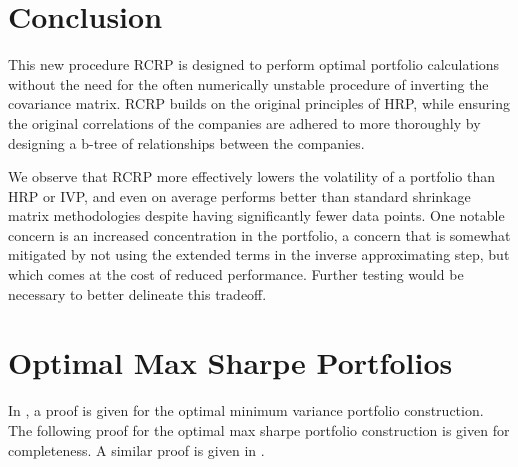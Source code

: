 \documentclass[10pt,twoside,titlepage]{article}   %
\begin{document}
\section{Conclusion}\label{sec-Conclusions}
This new procedure RCRP is designed to perform optimal portfolio calculations without the need for the often numerically unstable procedure of inverting the covariance matrix. 
RCRP builds on the original principles of HRP, while ensuring the original correlations of the companies are adhered to more thoroughly by designing a b-tree of relationships between the companies. 

We observe that RCRP more effectively lowers the volatility of a portfolio than HRP or IVP, 
and even on average performs better than standard shrinkage matrix methodologies despite having significantly fewer data points. 
One notable concern is an increased concentration in the portfolio, 
a concern that is somewhat mitigated by not using the extended terms in the inverse approximating step, 
but which comes at the cost of reduced performance. 
Further testing would be necessary to better delineate this tradeoff.

\clearpage

\appendix
\section{Optimal Max Sharpe Portfolios}\label{sec-Appendix1}
In \cite{HRP}, a proof is given for the optimal minimum variance portfolio construction. 
The following proof for the optimal max sharpe portfolio construction is given for completeness. 
A similar proof is given in \cite{StackExchange}.
\end{document}
